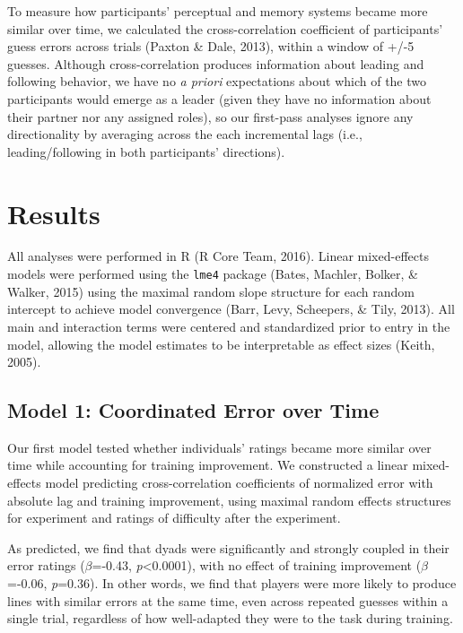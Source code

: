 \documentclass[10pt, letterpaper]{article}
\begin{document}
To measure how participants' perceptual and memory systems became more
similar over time, we calculated the cross-correlation coefficient of
participants' guess errors across trials (Paxton \& Dale, 2013), within
a window of +/-5 guesses. Although cross-correlation produces
information about leading and following behavior, we have no \emph{a
priori} expectations about which of the two participants would emerge as
a leader (given they have no information about their partner nor any
assigned roles), so our first-pass analyses ignore any directionality by
averaging across the each incremental lags (i.e., leading/following in
both participants' directions).

\section{Results}\label{results}

All analyses were performed in R (R Core Team, 2016). Linear
mixed-effects models were performed using the \texttt{lme4} package
(Bates, Machler, Bolker, \& Walker, 2015) using the maximal random slope
structure for each random intercept to achieve model convergence (Barr,
Levy, Scheepers, \& Tily, 2013). All main and interaction terms were
centered and standardized prior to entry in the model, allowing the
model estimates to be interpretable as effect sizes (Keith, 2005).

\subsection{Model 1: Coordinated Error over
Time}\label{model-1-coordinated-error-over-time}

Our first model tested whether individuals' ratings became more similar
over time while accounting for training improvement. We constructed a
linear mixed-effects model predicting cross-correlation coefficients of
normalized error with absolute lag and training improvement, using
maximal random effects structures for experiment and ratings of
difficulty after the experiment.

As predicted, we find that dyads were significantly and strongly coupled
in their error ratings (\emph{\(\beta\)}=-0.43,
\emph{p}\textless{}0.0001), with no effect of training improvement
(\emph{\(\beta\)}=-0.06, \emph{p}=0.36). In other words, we find that
players were more likely to produce lines with similar errors at the
same time, even across repeated guesses within a single trial,
regardless of how well-adapted they were to the task during training.
\end{document}
